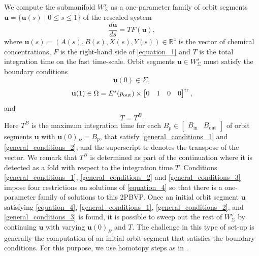 \documentclass{ws-ijbc}
\begin{document}
We compute the submanifold $W^s_{\Sigma}$ as a one-parameter family of orbit segments $\mathbf{u} = \{\mathbf{u}(s) \;|\; 0 \leq s \leq 1 \}$ of the rescaled system
%
\begin{equation}
\frac{d\mathbf{u}}{ds} = TF(\mathbf{u}),
\label{equation_4}
\end{equation}
%
where $\mathbf{u}(s) = (A(s), B(s), X(s), Y(s)) \in \mathbb{R}^4$ is the vector of chemical concentrations, $F$ is the right-hand side of \eqref{equation_1} and $T$ is the total integration time on the fast time-scale.  Orbit segments $\mathbf{u} \in W^s_{\Sigma}$ must satisfy the boundary conditions
%
\begin{equation}
	\mathbf{u}(0) \in \Sigma,
	\label{general_conditions_1}
\end{equation}
%
\begin{equation}
	\mathbf{u}(1) \in \Omega = E^s(p_{\text{out}}) \times \begin{bmatrix} 0 & 1 & 0 & 0 \end{bmatrix}^{\rm tr},
	\label{general_conditions_2}
\end{equation}
%
and
%
\begin{equation}
	T=T^{B}.
	\label{general_conditions_3}
\end{equation}
%
Here $T^{B}$ is the maximum integration time for each $B_p \in \begin{bmatrix} B_{\text{in}} & B_{\text{out}} \end{bmatrix}$ of orbit segments $\mathbf{u}$ with $\mathbf{u}(0)_B=B_p$, that satisfy \eqref{general_conditions_1} and \eqref{general_conditions_2}, and the superscript tr denotes the transpose of the vector.  We remark that $T^B$ is determined as part of the continuation where it is detected as a fold with respect to the integration time $T$.  Conditions \eqref{general_conditions_1}, \eqref{general_conditions_2}  and \eqref{general_conditions_3} impose four restrictions on solutions of \eqref{equation_4} so that there is a one-parameter family of solutions to this 2PBVP.  Once an initial orbit segment $\mathbf{u}$ satisfying \eqref{equation_4}, \eqref{general_conditions_1}, \eqref{general_conditions_2}, and \eqref{general_conditions_3} is found, it is possible to sweep out the rest of $W^s_{\Sigma}$ by continuing $\mathbf{u}$ with varying $\mathbf{u}(0)_B$ and $T$.  The challenge in this type of set-up is generally the computation of an initial orbit segment that satisfies the boundary conditions.  For this purpose, we use homotopy steps as in  \cite{homotopy_example, Saeed_Paper}.
\end{document}
